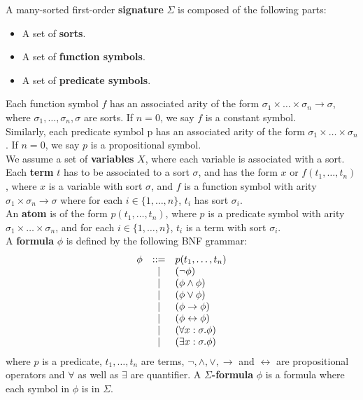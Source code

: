 \begin{definition}
A many-sorted first-order \textbf{signature} $\Sigma$ is composed of the following parts:
\begin{itemize}
 \item A set of \textbf{sorts}. 
 \item A set of \textbf{function symbols}.
 \item A set of \textbf{predicate symbols}.
\end{itemize}
Each function symbol $f$ has an associated arity of the form $\sigma_1 \times \ldots \times \sigma_n \to \sigma$, where $\sigma_1, \ldots, \sigma_n, \sigma$ are sorts. If $n=0$, we say $f$ is a constant symbol. \\
Similarly, each predicate symbol p has an associated arity of the form $\sigma_1 \times \ldots \times \sigma_n$. If $n=0$, we say $p$ is a propositional symbol. \\
We assume a set of \textbf{variables} $X$, where each variable is associated with a sort.\\
Each \textbf{term} $t$ has to be associated to a sort $\sigma$, and has the form $x$ or $f(t_1, \ldots, t_n)$, where $x$ is a variable with sort $\sigma$, and $f$ is a function symbol with arity $\sigma_1 \times \sigma_n \to \sigma$ where for each $i \in \{1, \ldots, n\}$, $t_i$ has sort $\sigma_i$. \\
An \textbf{atom} is of the form $p(t_1, \ldots, t_n)$, where $p$ is a predicate symbol with arity $\sigma_1 \times \ldots \times \sigma_n$, and for each $i \in \{1, \ldots, n\}$, $t_i$ is a term with sort $\sigma_i$.\\
A \textbf{formula} $\phi$ is defined by the following BNF grammar:
 \[
 \begin{array}{l c l}
 \phi &::= & p(t_1, \ldots, t_n)\\ 
 	& | & (\neg \phi)\\
 	& | & (\phi \land \phi)\\ 
 	& | & (\phi \lor \phi)\\
 	& | & (\phi \rightarrow \phi)\\
 	& | & (\phi \leftrightarrow \phi)\\
 	& | & (\forall x : \sigma . \phi)\\
 	& | & (\exists x : \sigma . \phi)
 \end{array}
 \]
where $p$ is a predicate, $t_1, \ldots, t_n$ are terms, $\neg, \land, \lor, \rightarrow$ and $\leftrightarrow$ are propositional operators and $\forall$ as well as $\exists$ are quantifier.
A $\Sigma$\textbf{-formula} $\phi$ is a formula where each symbol in $\phi$ is in $\Sigma$.
\end{definition}

